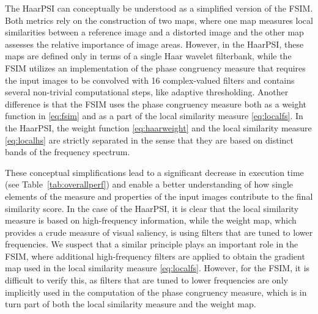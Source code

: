 \documentclass[11pt,a4paper]{article}
\begin{document}
The HaarPSI can conceptually be understood as a simplified version of the FSIM. Both metrics rely on the construction of two maps, where one map measures local similarities between a reference image and a distorted image and the other map assesses the relative importance of image areas. However, in the HaarPSI, these maps are defined only in terms of a single Haar wavelet filterbank, while the FSIM utilizes an implementation of the phase congruency measure that requires the input images to be convolved with 16 complex-valued filters and contains several non-trivial computational steps, like adaptive thresholding. Another difference is that the FSIM uses the phase congruency measure both as a weight function in {\eqref{eq:fsim}} and as a part of the local similarity measure {\eqref{eq:localfs}}. In the HaarPSI, the weight function {\eqref{eq:haarweight}} and the local similarity measure {\eqref{eq:localhs}} are strictly separated in the sense that they are based on distinct bands of the frequency spectrum.

These conceptual simplifications lead to a significant decrease in execution time (see Table~{\ref{tab:overallperf}}) and enable a better understanding of how single elements of the measure and properties of the input images contribute to the final similarity score. In the case of the HaarPSI, it is clear that the local similarity measure is based on high-frequency information, while the weight map, which provides a crude measure of visual saliency, is using filters that are tuned to lower frequencies. We suspect that a similar principle plays an important role in the FSIM, where additional high-frequency filters are applied to obtain the gradient map used in the local similarity measure {\eqref{eq:localfs}}. However, for the FSIM, it is difficult to verify this, as filters that are tuned to lower frequencies are only implicitly used in the computation of the phase congruency measure, which is in turn part of both the local similarity measure and the weight map.
\end{document}
